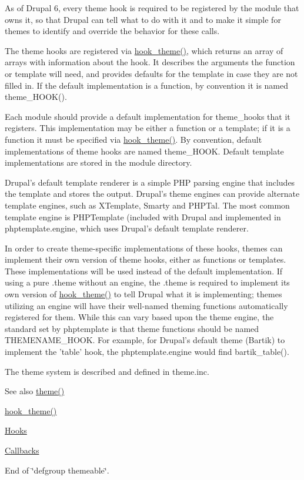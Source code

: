 As of Drupal 6, every theme hook is required to be registered by the module that owns it, so that Drupal can tell what to do with it and to make it simple for themes to identify and override the behavior for these calls.

The theme hooks are registered via \hyperlink{group__hooks_ga013ccb45c7aaab1c16cf9691428c910d}{hook\_\-theme()}, which returns an array of arrays with information about the hook. It describes the arguments the function or template will need, and provides defaults for the template in case they are not filled in. If the default implementation is a function, by convention it is named theme\_\-HOOK().

Each module should provide a default implementation for theme\_\-hooks that it registers. This implementation may be either a function or a template; if it is a function it must be specified via \hyperlink{group__hooks_ga013ccb45c7aaab1c16cf9691428c910d}{hook\_\-theme()}. By convention, default implementations of theme hooks are named theme\_\-HOOK. Default template implementations are stored in the module directory.

Drupal's default template renderer is a simple PHP parsing engine that includes the template and stores the output. Drupal's theme engines can provide alternate template engines, such as XTemplate, Smarty and PHPTal. The most common template engine is PHPTemplate (included with Drupal and implemented in phptemplate.engine, which uses Drupal's default template renderer.

In order to create theme-\/specific implementations of these hooks, themes can implement their own version of theme hooks, either as functions or templates. These implementations will be used instead of the default implementation. If using a pure .theme without an engine, the .theme is required to implement its own version of \hyperlink{group__hooks_ga013ccb45c7aaab1c16cf9691428c910d}{hook\_\-theme()} to tell Drupal what it is implementing; themes utilizing an engine will have their well-\/named theming functions automatically registered for them. While this can vary based upon the theme engine, the standard set by phptemplate is that theme functions should be named THEMENAME\_\-HOOK. For example, for Drupal's default theme (Bartik) to implement the 'table' hook, the phptemplate.engine would find bartik\_\-table().

The theme system is described and defined in theme.inc.

\begin{DoxySeeAlso}{See also}
\hyperlink{includes_2theme_8inc_a7c25609a935874541a19657affd30fff}{theme()} 

\hyperlink{group__hooks_ga013ccb45c7aaab1c16cf9691428c910d}{hook\_\-theme()} 

\hyperlink{group__hooks}{Hooks} 

\hyperlink{group__callbacks}{Callbacks}
\end{DoxySeeAlso}
End of \char`\"{}defgroup themeable\char`\"{}. 

